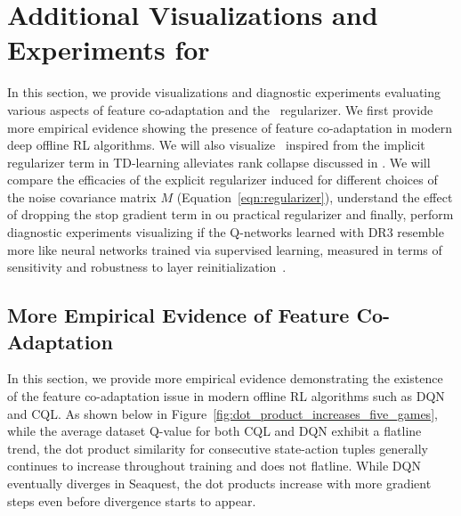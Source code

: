 \section{Additional Visualizations and Experiments for \drmethodname}

In this section, we provide visualizations and diagnostic experiments evaluating various  aspects of feature co-adaptation and the \drmethodname\ regularizer. We first provide more empirical evidence showing the presence of feature co-adaptation in modern deep offline RL algorithms. We will also visualize \drmethodname\, inspired from the implicit regularizer term in TD-learning alleviates rank collapse discussed in \citet{kumar2021implicit}. We will compare the efficacies of the explicit regularizer induced for different choices of the noise covariance matrix $M$ (Equation~\ref{eqn:regularizer}), understand the effect of dropping the stop gradient term in ou practical regularizer and finally, perform diagnostic experiments visualizing if the Q-networks learned with DR3 resemble more like neural networks trained via supervised learning, measured in terms of sensitivity and robustness to layer reinitialization~\citep{zhang2019all}.

\vspace{-0.05in}
\subsection{More Empirical Evidence of Feature Co-Adaptation}
\label{app:more_evidence_coadaptation}
In this section, we provide more empirical evidence demonstrating the existence of the feature co-adaptation issue in modern offline RL algorithms such as DQN and CQL. As shown below in Figure~\ref{fig:dot_product_increases_five_games}, while the average dataset Q-value for both CQL and DQN exhibit a flatline trend, the dot product similarity for consecutive state-action tuples generally continues to increase throughout training and does not flatline. While DQN eventually diverges in Seaquest, the dot products increase with more gradient steps even before divergence starts to appear.  

